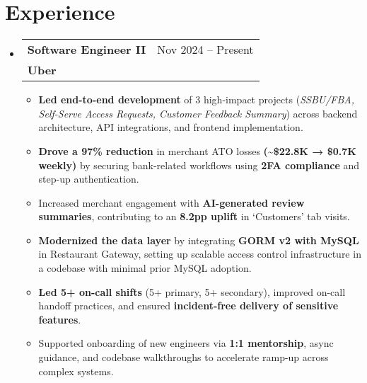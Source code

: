 \documentclass[letterpaper,10.8pt]{article}
\makeatletter
\newcommand{\resumeSubheading}[4]{
  \vspace{-1pt}\item
    \begin{tabular*}{0.97\textwidth}{l@{\extracolsep{\fill}}r}
      \textbf{#1} & #2 \\
      \textbf{#3} & \textit{\small #4} \\
    \end{tabular*}\vspace{-5pt}
}
\newcommand{\resumeSubHeadingListStart}{\begin{itemize}[leftmargin=*]}
\newcommand{\resumeSubHeadingListEnd}{\end{itemize}}
\makeatother
\begin{document}
\section{Experience}
\resumeSubHeadingListStart
  \resumeSubheading
    {Software Engineer II}{Nov 2024 – Present}
    {Uber}{}
    \begin{itemize}[itemsep=0pt]
        \item \textbf{Led end-to-end development} of 3 high-impact projects (\textit{SSBU/FBA, Self-Serve Access Requests, Customer Feedback Summary}) across backend architecture, API integrations, and frontend implementation.
        \item \textbf{Drove a 97\% reduction} in merchant ATO losses \textbf{(\textasciitilde\$22.8K → \$0.7K weekly)} by securing bank-related workflows using \textbf{2FA compliance} and step-up authentication.
        \item Increased merchant engagement with \textbf{AI-generated review summaries}, contributing to an \textbf{8.2pp uplift} in ‘Customers’ tab visits.
        \item \textbf{Modernized the data layer} by integrating \textbf{GORM v2 with MySQL} in Restaurant Gateway, setting up scalable access control infrastructure in a codebase with minimal prior MySQL adoption.
        \item \textbf{Led 5+ on-call shifts} (5+ primary, 5+ secondary), improved on-call handoff practices, and ensured \textbf{incident-free delivery of sensitive features}.
        \item Supported onboarding of new engineers via \textbf{1:1 mentorship}, async guidance, and codebase walkthroughs to accelerate ramp-up across complex systems.
    \end{itemize}
\resumeSubHeadingListEnd
\end{document}
